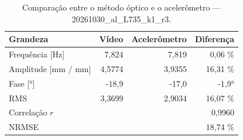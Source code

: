 \begin{table}[htbp]
  \centering
  \caption{Comparação entre o método óptico e o acelerômetro — 20261030\_al\_L735\_k1\_r3.}
  \label{tab:comp_20261030_al_L735_k1_r3}
  \begin{tabular}{lrrr}
    \toprule
    Grandeza & Vídeo & Acelerômetro & Diferença \\
    \midrule
    Frequência [Hz] & 7{,}824 & 7{,}819 & 0{,}06 \% \\
    Amplitude [mm / mm] & 4{,}5774 & 3{,}9355 & 16{,}31 \% \\
    Fase [°] & -18{,}9 & -17{,}0 & -1{,}9° \\
    RMS & 3{,}3699 & 2{,}9034 & 16{,}07 \% \\
    Correlação $r$ &  &  & 0{,}9960 \\
    NRMSE &  &  & 18{,}74 \% \\
    \bottomrule
  \end{tabular}
\end{table}
